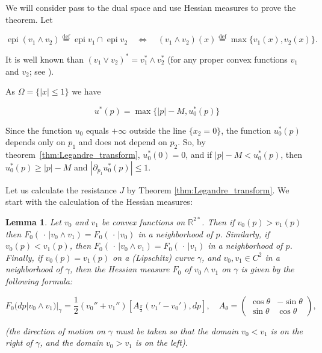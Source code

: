 \documentclass[14pt]{extarticle}
\renewcommand{\le}{\leqslant}
\renewcommand{\ge}{\geqslant}
\newcommand{\R}{\mathbb{R}}
\newcommand{\eqdef}{\stackrel{\mathrm{def}}{=}}
\DeclareMathOperator{\epi}{\mathrm{epi}}
\newtheorem{lemma}{Lemma}
\theoremstyle{remark}
\theoremstyle{definition}
\begin{document}
We will consider pass to the dual space and use Hessian measures to prove the theorem. Let

\[
	\epi(v_1\wedge v_2) \eqdef \epi v_1\cap \epi v_2
	\quad\Leftrightarrow\quad
	(v_1\wedge v_2)(x) \eqdef \max\{v_1(x),v_2(x)\}.
\]

\noindent It is well known than $(v_1\vee v_2)^* = v_1^*\wedge v_2^*$ (for any proper convex functions $v_1$ and $v_2$; see \cite[chapter 3, \S 5, Theorem 16.5]{Rockafellar}).

As $\Omega=\{|x|\le 1\}$ we have

\begin{equation}
\label{eq:max_p_u_1}
	u^*(p) = \max\{|p|-M,u_0^*(p)\}
\end{equation}

Since the function $u_0$ equals $+\infty$ outside the line $\{x_2=0\}$, the function $u_0^*(p)$ depends only on $p_1$ and does not depend on $p_2$. So, by theorem~\ref{thm:Legandre_transform}, $u_0^*(0)=0$, and if $|p|-M < u_0^*(p)$, then $u_0^*(p)\ge|p|-M$ and $|\partial_{p_1}u_0^*(p)|\le 1$.

Let us calculate the resistance $J$ by Theorem \ref{thm:Legandre_transform}. We start with the calculation of the Hessian measures:

\begin{lemma}
\label{lm:F2_max}
	Let $v_0$ and $v_1$ be convex functions on $\R^{2*}$. Then if $v_0(p)>v_1(p)$ then $F_0(\,\cdot\,|v_0\wedge v_1)=F_0(\,\cdot\,|v_0)$ in a neighborhood of $p$. Similarly, if $v_0(p)<v_1(p)$, then $F_0(\,\cdot\,|v_0\wedge v_1)=F_0(\,\cdot\,|v_1)$ in a neighborhood of $p$. Finally, if $v_0(p)=v_1(p)$ on a (Lipschitz) curve $\gamma$, and $v_0,v_1\in C^2$ in a neighborhood of $\gamma$, then the Hessian measure $F_0$ of $v_0\wedge v_1$ on $\gamma$ is given by the following formula:
	
	\[
		F_0(dp|v_0\wedge v_1)|_{\gamma} = \frac12 (v_0''+v_1'')[A_{\frac\pi2}(v_1'-v_0'),dp],
		\quad
		A_\theta=\left(\begin{array}{rr}
			\cos\theta&-\sin\theta\\
			\sin\theta& \cos\theta
		\end{array}\right),
	\]

	\noindent (the direction of motion on $\gamma$ must be taken so that the domain $v_0<v_1$ is on the right of $\gamma$, and the domain $v_0>v_1$ is on the left).
\end{lemma}
\end{document}
